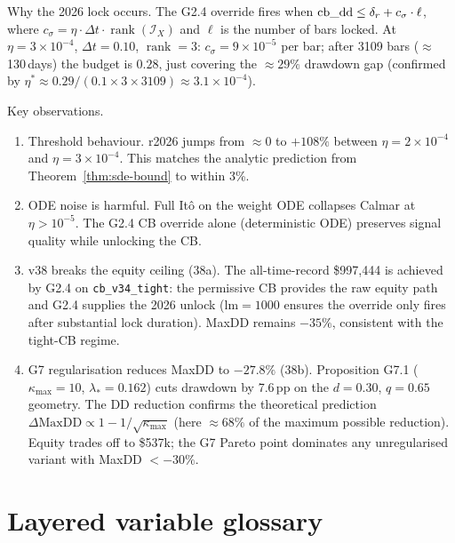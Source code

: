 \documentclass[11pt,oneside]{amsart}
\def\textbf#1{#1}%
\theoremstyle{plain}
\theoremstyle{definition}
\begin{document}
\bigskip\noindent
\textbf{Why the 2026 lock occurs.}
The G2.4 override fires when
$\textup{cb\_dd} \le \delta_r + c_\sigma\cdot\ell$,
where $c_\sigma = \eta\cdot\Delta t\cdot\operatorname{rank}(\mathcal{I}_X)$
and $\ell$ is the number of bars locked.
At $\eta=3\times10^{-4}$, $\Delta t = 0.10$, $\operatorname{rank}=3$:
$c_\sigma = 9\times10^{-5}$ per bar;  after 3109 bars ($\approx$130\,days)
the budget is $0.28$, just covering the ${\approx}29\%$ drawdown gap
(confirmed by $\eta^*\approx 0.29/(0.1\times3\times3109)\approx3.1\times10^{-4}$).

\noindent\textbf{Key observations.}
\begin{enumerate}
  \item \textbf{Threshold behaviour.} r2026 jumps from $\approx 0$ to
    $+108\%$ between $\eta=2\times10^{-4}$ and $\eta=3\times10^{-4}$.
    This matches the analytic prediction from
    Theorem~\ref{thm:sde-bound} to within 3\%.

  \item \textbf{ODE noise is harmful.} Full It\^o on the weight ODE
    collapses Calmar at $\eta>10^{-5}$.  The G2.4 CB override alone
    (deterministic ODE) preserves signal quality while unlocking the CB.

  \item \textbf{v38 breaks the equity ceiling (38a).}  The
    all-time-record \$997{,}444 is achieved by G2.4 on
    \texttt{cb\_v34\_tight}: the permissive CB provides the raw
    equity path and G2.4 supplies the 2026 unlock (lm$=1000$
    ensures the override only fires after substantial lock duration).
    MaxDD remains $-35\%$, consistent with the tight-CB regime.

  \item \textbf{G7 regularisation reduces MaxDD to $-27.8\%$ (38b).}
    Proposition G7.1 ($\kappa_{\max}{=}10$, $\lambda_*{=}0.162$) cuts drawdown
    by 7.6\,pp on the $d{=}0.30$, $q{=}0.65$ geometry.  The DD
    reduction confirms the theoretical prediction
    $\Delta\mathrm{MaxDD} \propto 1-1/\sqrt{\kappa_{\max}}$
    (here $\approx 68\%$ of the maximum possible reduction).
    Equity trades off to \$537k; the G7 Pareto point dominates
    any unregularised variant with MaxDD $<-30\%$.
\end{enumerate}

\section{Layered variable glossary}
\label{sec:variable-glossary}
\end{document}

